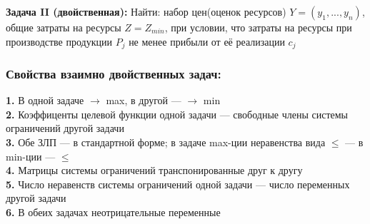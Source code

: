 \textbf{Задача II (двойственная):}
Найти: набор цен(оценок ресурсов) $Y=(y_1,...,y_n)$, общие затраты на ресурсы $Z=Z_{min}$, при условии, что затраты на ресурсы при производстве продукции $P_j$ не менее прибыли от её реализации $c_j$
\\
\subsubsection{Свойства взаимно двойственных задач:}
\textbf{1.} В одной задаче $\rightarrow$ max, в другой --- $\rightarrow$ min\\
\textbf{2.} Коэффиценты целевой функции одной задачи --- свободные члены системы ограничений другой задачи\\
\textbf{3.} Обе ЗЛП --- в стандартной форме; в задаче max-ции неравенства вида $\leq$ --- в min-ции --- $\leq$\\
\textbf{4.} Матрицы системы ограничений транспонированные друг к другу\\
\textbf{5.} Число неравенств системы ограничений одной задачи --- число переменных другой задачи\\
\textbf{6.} В обеих задачах неотрицательные переменные\\
\subsubsection{}
  
